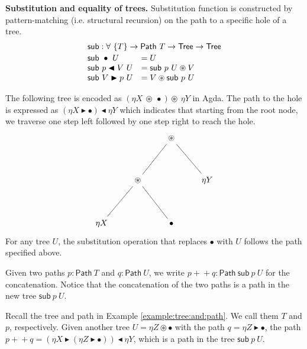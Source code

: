 \documentclass[runningheads]{llncs}
\newcommand{\cdast}{\circledast}
\newcommand{\btleft}{\blacktriangleleft}
\newcommand{\btright}{\blacktriangleright}
\newcommand{\Tree}{\mathsf{Tree}}
\newcommand{\path}[1]{\mathsf{Path} ~ #1}
\newcommand{\Sub}{\mathsf{sub}}
\newcommand{\sub}[2]{\mathsf{sub} ~ #1 ~ #2}
\begin{document}
\noindent\textbf{Substitution and equality of trees.}
Substitution function is constructed by pattern-matching (i.e. structural recursion) on the path to a specific hole of a tree.
\[
\begin{array}{ll}
  \multicolumn{2}{l}{\Sub : \forall ~ \{T\} \to \path{T} \to \Tree \to \Tree}
  \\[2pt]
  \sub{\bullet}{U} &= U
  \\
  \sub{p \btleft V}{U} &= \sub{p}{U} \cdast V
  \\
  \sub{V \btright p}{U} &= V \cdast \sub{p}{U} 
\end{array}
\]

\begin{example}\label{example:tree:and:path}
The following tree is encoded as $(\eta X ~ \cdast ~ \bullet) \cdast ~ \eta Y$ in Agda.
The path to the hole is expressed as $(\eta X \btright \bullet) \btleft \eta Y$ which indicates that starting from the root node, we traverse one step left followed by one step right to reach the hole.
\[
\begin{tikzcd}
	&& \cdast \\
	\\
	& \cdast && {\eta Y} \\
	\\
	{\eta X} && \bullet
	\arrow[no head, from=1-3, to=3-2]
	\arrow[no head, from=1-3, to=3-4]
	\arrow[no head, from=3-2, to=5-1]
	\arrow[no head, from=3-2, to=5-3]
\end{tikzcd}
\]
For any tree $U$, the substitution operation that replaces $\bullet$ with $U$ follows the path specified above.
\end{example}
Given two paths $p : \path{T}$ and $q : \path{U}$, we write $p +\!\!+ q : \path{\sub{p}{U}}$ for the concatenation.
Notice that the concatenation of the two paths is a path in the new tree $\sub{p}{U}$.
\begin{example}\label{example:path:concatenation}
  Recall the tree and path in Example \ref{example:tree:and:path}. We call them $T$ and $p$, respectively.
  Given another tree $U = \eta Z \cdast \bullet$ with the path $q = \eta Z \btright \bullet$, the path $p +\!\!+ q = (\eta X \btright (\eta Z \btright \bullet)) \btleft \eta Y$, which is a path in the tree $\sub{p}{U}$.
\end{example}
\end{document}
